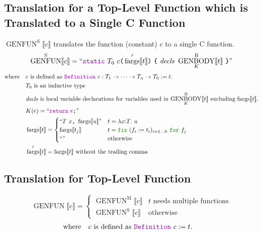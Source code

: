 \documentclass[a4paper,fleqn]{article}
\newcommand{\kwDefinition}{\mbox{\color{myviolet}\ttfamily Definition}}
\newcommand{\kwfix}{\mbox{\color{mygreen}\ttfamily fix}}
\newcommand{\kwfor}{\mbox{\color{mygreen}\ttfamily for}}
\newcommand{\lamT}[3]{\lambda #1\mathord{:}#2.~#3}
\newcommand{\fix}[4]{\kwfix~(#1 := #2)_{#3}~\kwfor~#4}
\newcommand{\BRA}[1]{\llbracket #1 \rrbracket}
\DeclareMathOperator{\genbody}{GENBODY}
\newcommand{\genbodyb}[2]{\genbody^\mathrm{B}_{#1}\BRA{#2}}
\DeclareMathOperator{\genfunop}{GENFUN}
\newcommand{\genfun}[1]{\genfunop\BRA{#1}}
\newcommand{\genfuns}[1]{\genfunop^\mathrm{S}\BRA{#1}}
\newcommand{\genfunm}[1]{\genfunop^\mathrm{M}\BRA{#1}}
\newcommand{\dq}[1]{\text{``}#1\text{''}}
\newcommand{\ttparen}[1]{\texttt{(}#1\texttt{)}}
\newcommand{\ttbrace}[1]{\texttt{\{}#1\texttt{\}}}
\newcommand{\ttsemi}{\texttt{;}}
\newcommand{\ttcomma}{\texttt{,}}
\newcommand{\kwCreturn}{\mbox{\color{myviolet}\ttfamily return}}
\newcommand{\kwstatic}{\mbox{\color{myviolet}\ttfamily static}}
\DeclareMathOperator{\fargsop}{fargs}
\newcommand{\fargs}[1]{\fargsop\BRA{#1}}
\newcommand{\fargsd}[1]{\fargsop'\BRA{#1}}
\begin{document}
\subsection{Translation for a Top-Level Function which is Translated to a Single C Function}\label{sec:genfuns}
\raggedright
$\genfuns{c}$ translates the function (constant) $c$ to a single C function.
\[
  \genfuns{c} = \dq{\kwstatic~T_0~c\ttparen{\fargsd{t}}~\ttbrace{~\mathit{decls}~\genbodyb{K}{t}~}}
\]
\[ \text{where} \quad
  \begin{aligned}[t]
    & \text{$c$ is defined as \kwDefinition~$c : T_1 \rightarrow \dots \rightarrow T_n \rightarrow T_0 := t.$} \\
    & \text{$T_0$ is an inductive type} \\
    & \text{$\mathit{decls}$ is local variable declarations for variables used in $\genbodyb{K}{t}$ excluding $\fargs{t}$.} \\
    & K(e) = \dq{\kwCreturn~e\ttsemi} \\
    & \fargs{t} =
      \begin{cases}
        \dq{T~x\ttcomma~\fargs{u}}      & t = \lamT{x}{T}{u} \\
        \fargs{t_j}       & t = \fix{f_i}{t_i}{i=1\dots h}{f_j} \\
        \dq{}    & \text{otherwise}
      \end{cases} \\
    & \fargsd{t} = \fargs{t}~\text{without the trailing comma}
  \end{aligned}
\]

\subsection{Translation for Top-Level Function}\label{sec:genfun}
\raggedright
\[
  \genfun{c} =
  \begin{cases}
    \genfunm{c} & \text{$t$ needs multiple functions} \\
    \genfuns{c} & \text{otherwise}
  \end{cases}
\]
\[ \text{where} \quad
  \begin{aligned}[t]
    & \text{$c$ is defined as \kwDefinition~$c := t.$}
  \end{aligned}
\]



\end{document}
